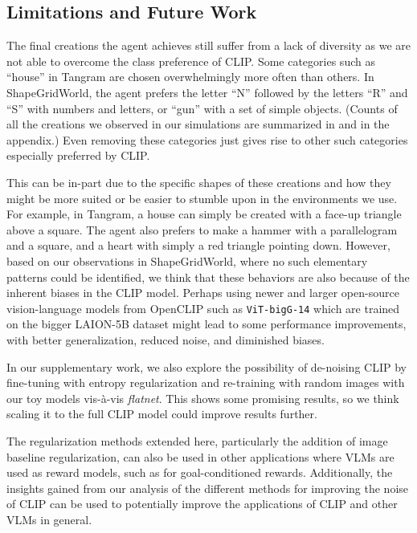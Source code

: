 \subsection*{Limitations and Future Work}
\label{sec:future-work}

The final creations the agent achieves still suffer from a lack of diversity as we are not able to overcome the class preference of CLIP.
Some categories such as ``house'' in Tangram are chosen overwhelmingly more often than others.
In ShapeGridWorld, the agent prefers the letter ``N'' followed by the letters ``R'' and ``S'' with numbers and letters, or ``gun'' with a set of simple objects.
(Counts of all the creations we observed in our simulations are summarized in  and  in the appendix.)
Even removing these categories just gives rise to other such categories especially preferred by CLIP.

This can be in-part due to the specific shapes of these creations and how they might be more suited or be easier to stumble upon in the environments we use.
For example, in Tangram, a house can simply be created with a face-up triangle above a square.
The agent also prefers to make a hammer with a parallelogram and a square, and a heart with simply a red triangle pointing down.
However, based on our observations in ShapeGridWorld, where no such elementary patterns could be identified, we think that these behaviors are also because of the inherent biases in the CLIP model.
% 
Perhaps using newer and larger open-source vision-language models from OpenCLIP such as \texttt{ViT-bigG-14} \citep{openclip} which are trained on the bigger LAION-5B dataset \citep{laion5b} might lead to some performance improvements, with better generalization, reduced noise, and diminished biases.

In our supplementary work, we also explore the possibility of de-noising CLIP by fine-tuning with entropy regularization and re-training with random images with our toy models vis-\`a-vis \emph{flatnet}. This shows some promising results, so we think scaling it to the full CLIP model could improve results further.

The regularization methods extended here, particularly the addition of image baseline regularization, can also be used in other applications where VLMs are used as reward models, such as for goal-conditioned rewards.
Additionally, the insights gained from our analysis of the different methods for improving the noise of CLIP can be used to potentially improve the applications of CLIP and other VLMs in general.

